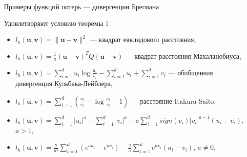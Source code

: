 \documentclass{beamer}
\begin{document}
\begin{frame}{Примеры функций потерь --- дивергенции Брегмана}

    Удовлетворяют условию теоремы 1
    \vfill
    \begin{itemize}
        \item $l_h(\mathbf{u}, \mathbf{v}) = \| \mathbf{u} - \mathbf{v}
        \|^2$ --- квадрат евклидового расстояния,
        \item $l_h(\mathbf{u}, \mathbf{v}) = \frac{1}{2} (\mathbf{u} - \mathbf{v})^{T} Q (\mathbf{u} -
        \mathbf{v})$ --- квадрат расстояния Махаланобиуса,
        \item $l_h(\mathbf{u}, \mathbf{v}) = \sum\limits_{i=1}^d u_i \log \frac{u_i}{v_i} - \sum\limits_{i=1}^d u_i + \sum\limits_{i=1}^d
        v_i$ --- обобщенная дивергенция Кульбака-Лейблера,
        \item $l_h(\mathbf{u}, \mathbf{v}) = \sum\limits_{i=1}^d \left( \frac{u_i}{v_i} - \log \frac{u_i}{v_i} - 1
        \right)$ --- расстояние Itakura-Saito,
        \item ${l_h(\mathbf{u}, \mathbf{v}) = \sum\limits_{i=1}^d |u_i|^a - \sum\limits_{i=1}^d |v_i|^a -
        a \sum\limits_{i=1}^d sign(v_i) |v_i|^{a-1} (u_i - v_i)}$,
        $a > 1$,
        \item $l_h(\mathbf{u}, \mathbf{v}) = \frac{2}{a^2} \sum\limits_{i=1}^d (e^{au_i} - e^{av_i}) -
        \frac{2}{a} \sum\limits_{i=1}^d e^{av_i} (u_i -v_i)$, $a \neq
        0$.
    \end{itemize}
\end{frame}
\end{document}
